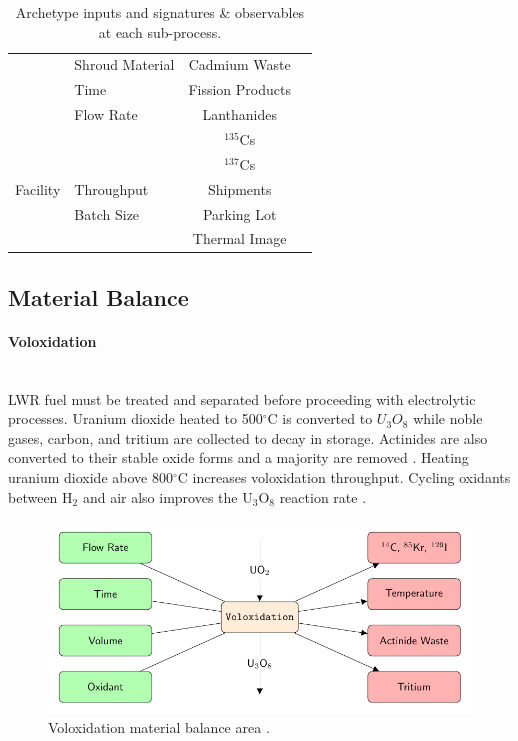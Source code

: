 \begin{table}[h]
\begin{tabularx}{0.9\linewidth}{llcr}
		& Shroud Material & Cadmium Waste & \cite{lee_korean_2011} \\
		& Time & Fission Products & \cite{borrelli_approaches_2017} \\
		& Flow Rate & Lanthanides & \\
		&  & $^{135}$Cs & \\
		&  & $^{137}$Cs & \\ \hline
		Facility & Throughput & Shipments & \\
		& Batch Size & Parking Lot & \\
		& & Thermal Image & \\
		\hline
	\end{tabularx}
	\caption {Archetype inputs and signatures \& observables at each sub-process.}
	\label {tab:params}
\end{table}

\subsection{Material Balance}
\paragraph{Voloxidation} \mbox{}\\
\gls{LWR} fuel must be treated and separated before proceeding with electrolytic processes. Uranium dioxide heated to 
500$^{\circ}$C is converted to $U_3O_8$ while noble gases, carbon, and tritium are collected to decay in storage. 
Actinides are also converted to their stable oxide forms and a majority are removed \cite{flowsheet_1998,jubin_spent_2009}. 
Heating uranium dioxide above 800$^{\circ}$C increases voloxidation throughput.
Cycling oxidants between H$_2$ and air also improves the U$_3$O$_8$ reaction rate \cite{jubin_spent_2009}.

\begin{figure}[h]
	\centering
	\includegraphics[width=0.9\linewidth]{images/volox}
	\caption{Voloxidation material balance area \cite{jubin_spent_2009}.}
	\label{fig:volox}
\end{figure}

